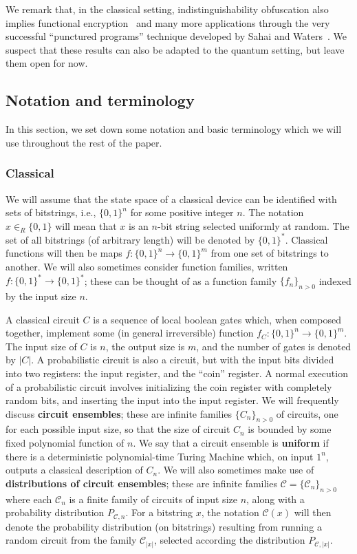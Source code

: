 \documentclass[11pt]{article}
\numberwithin{equation}{section}
\newcommand{\inrand}{\in_R}
\begin{document}
{We remark that, in the classical setting, indistinguishability obfuscation also implies functional encryption~\cite{GGHRSW13} and many more applications through the very successful ``punctured programs'' technique developed by Sahai and Waters~\cite{SW14}. We suspect that these results can also be adapted to the quantum setting, but leave them open for now.

\subsection{Notation and terminology}\label{sec:notation}

In this section, we set down some notation and basic terminology which we will use throughout the rest of the paper.

\subsubsection{Classical}

We will assume that the state space of a classical device can be identified with sets of bitstrings, i.e., $\{0, 1\}^n$ for some positive integer $n$. The notation $x \inrand \{0, 1\}$ will mean that $x$ is an $n$-bit string selected uniformly at random. The set of all bitstrings (of arbitrary length) will be denoted by $\{0, 1\}^*$. Classical functions will then be maps $f : \{0, 1\}^n \rightarrow \{0, 1\}^m$ from one set of bitstrings to another. We will also sometimes consider function families, written $f : \{0, 1\}^* \rightarrow \{0, 1\}^*$; these can be thought of as a function family $\{f_n\}_{n>0}$ indexed by the input size $n$. 

A classical circuit $C$ is a sequence of local boolean gates which, when composed together, implement some (in general irreversible) function $f_C: \{0, 1\}^n \rightarrow \{0, 1\}^m$. The input size of $C$ is $n$, the output size is $m$, and the number of gates is denoted by $|C|$. A probabilistic circuit is also a circuit, but with the input bits divided into two registers: the input register, and the ``coin'' register. A normal execution of a probabilistic circuit involves initializing the coin register with completely random bits, and inserting the input into the input register. We will frequently discuss \textbf{circuit ensembles}; these are infinite families $\{C_n\}_{n > 0}$ of circuits, one for each possible input size, so that the size of circuit $C_n$ is bounded by some fixed polynomial function of $n$.  We say that a circuit ensemble is \textbf{uniform} if there is a deterministic polynomial-time Turing Machine which, on input $1^n$, outputs a classical description of $C_n$.  We will also sometimes make use of \textbf{distributions of circuit ensembles}; these are infinite families $\mathcal C = \{\mathcal C_n\}_{n > 0}$ where each $\mathcal C_n$ is a finite family of circuits of input size $n$, along with a probability distribution $P_{\mathcal C, n}$. For a bitstring $x$, the notation $\mathcal C(x)$ will then denote the probability distribution (on bitstrings) resulting from running a random circuit from the family $\mathcal C_{|x|}$, selected according the distribution $P_{\mathcal C, |x|}$.

}
\end{document}
